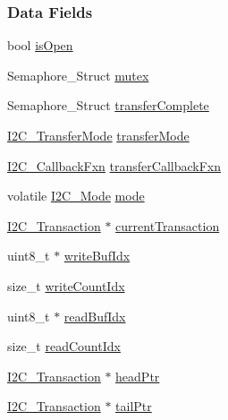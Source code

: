 \subsubsection*{Data Fields}
\begin{DoxyCompactItemize}
\item 
bool \hyperlink{struct_i2_c_e_u_s_c_i_b___object_a7a2541b1447de3860487e969cd9db507}{is\-Open}
\item 
Semaphore\-\_\-\-Struct \hyperlink{struct_i2_c_e_u_s_c_i_b___object_a7f263e57e9392a99fb21710d1ec990d8}{mutex}
\item 
Semaphore\-\_\-\-Struct \hyperlink{struct_i2_c_e_u_s_c_i_b___object_a668ac546b43712a7a213b2fb67a9870d}{transfer\-Complete}
\item 
\hyperlink{_i2_c_8h_a39f3b9340fc4ee241b0d2da9b2841c26}{I2\-C\-\_\-\-Transfer\-Mode} \hyperlink{struct_i2_c_e_u_s_c_i_b___object_aa853cc61dff83c4c4a61fee8e5ef5b93}{transfer\-Mode}
\item 
\hyperlink{_i2_c_8h_a5ece918abf136397f682df3924441634}{I2\-C\-\_\-\-Callback\-Fxn} \hyperlink{struct_i2_c_e_u_s_c_i_b___object_a8c7f61de39b730b75e03149794e31b1b}{transfer\-Callback\-Fxn}
\item 
volatile \hyperlink{_i2_c_8h_ac8f0941a68f18f5d1743a21ab32c7929}{I2\-C\-\_\-\-Mode} \hyperlink{struct_i2_c_e_u_s_c_i_b___object_a36c34cbe51d0aef5938fca37f61b8665}{mode}
\item 
\hyperlink{struct_i2_c___transaction}{I2\-C\-\_\-\-Transaction} $\ast$ \hyperlink{struct_i2_c_e_u_s_c_i_b___object_af76ab0c0557e406ff498a9956662a2cc}{current\-Transaction}
\item 
uint8\-\_\-t $\ast$ \hyperlink{struct_i2_c_e_u_s_c_i_b___object_a15430021a10c33816ea4fa1541c83bb6}{write\-Buf\-Idx}
\item 
size\-\_\-t \hyperlink{struct_i2_c_e_u_s_c_i_b___object_aa357dd4520e3dee44eba38616ee4fe83}{write\-Count\-Idx}
\item 
uint8\-\_\-t $\ast$ \hyperlink{struct_i2_c_e_u_s_c_i_b___object_ab670817ea9d58e86c0fae83305af13ef}{read\-Buf\-Idx}
\item 
size\-\_\-t \hyperlink{struct_i2_c_e_u_s_c_i_b___object_a2d9a88686967841645c4e7c1184f8b5a}{read\-Count\-Idx}
\item 
\hyperlink{struct_i2_c___transaction}{I2\-C\-\_\-\-Transaction} $\ast$ \hyperlink{struct_i2_c_e_u_s_c_i_b___object_a59c7dc75172c8cec5a6026a903d201f7}{head\-Ptr}
\item 
\hyperlink{struct_i2_c___transaction}{I2\-C\-\_\-\-Transaction} $\ast$ \hyperlink{struct_i2_c_e_u_s_c_i_b___object_a3a751caf7a6cbb75973b27ab13ab8cff}{tail\-Ptr}
\end{DoxyCompactItemize}


